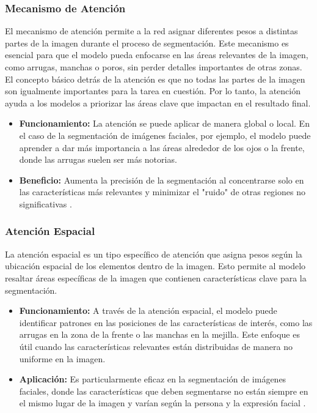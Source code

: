 \subsubsection{Mecanismo de Atención}  
El mecanismo de atención permite a la red asignar diferentes pesos a distintas partes de la imagen durante el proceso de segmentación. Este mecanismo es esencial para que el modelo pueda enfocarse en las áreas relevantes de la imagen, como arrugas, manchas o poros, sin perder detalles importantes de otras zonas. El concepto básico detrás de la atención es que no todas las partes de la imagen son igualmente importantes para la tarea en cuestión. Por lo tanto, la atención ayuda a los modelos a priorizar las áreas clave que impactan en el resultado final.  
\begin{itemize}
    \item \textbf{Funcionamiento:} La atención se puede aplicar de manera global o local. En el caso de la segmentación de imágenes faciales, por ejemplo, el modelo puede aprender a dar más importancia a las áreas alrededor de los ojos o la frente, donde las arrugas suelen ser más notorias.
    \item \textbf{Beneficio:} Aumenta la precisión de la segmentación al concentrarse solo en las características más relevantes y minimizar el "ruido" de otras regiones no significativas \cite{autor2021atencion}.
\end{itemize}

\subsubsection{Atención Espacial}  
La atención espacial es un tipo específico de atención que asigna pesos según la ubicación espacial de los elementos dentro de la imagen. Esto permite al modelo resaltar áreas específicas de la imagen que contienen características clave para la segmentación.  
\begin{itemize}
    \item \textbf{Funcionamiento:} A través de la atención espacial, el modelo puede identificar patrones en las posiciones de las características de interés, como las arrugas en la zona de la frente o las manchas en la mejilla. Este enfoque es útil cuando las características relevantes están distribuidas de manera no uniforme en la imagen.
    \item \textbf{Aplicación:} Es particularmente eficaz en la segmentación de imágenes faciales, donde las características que deben segmentarse no están siempre en el mismo lugar de la imagen y varían según la persona y la expresión facial \cite{autor2020spa}.
\end{itemize}

